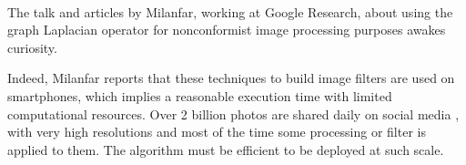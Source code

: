 \paragraph{}
The talk \cite{siam_slides_2016} and articles \cite{glide_2014} \cite{talebi_nonlocal_2014} by Milanfar, working at Google Research, about using the graph Laplacian operator for nonconformist image processing purposes awakes curiosity.

Indeed, Milanfar reports that these techniques to build image filters are used on smartphones, which implies a reasonable execution time with limited computational resources.
Over 2 billion photos are shared daily on social media \cite{siam_slides_2016}, with very high resolutions and most of the time some processing or filter is applied to them.
The algorithm must be efficient to be deployed at such scale.
